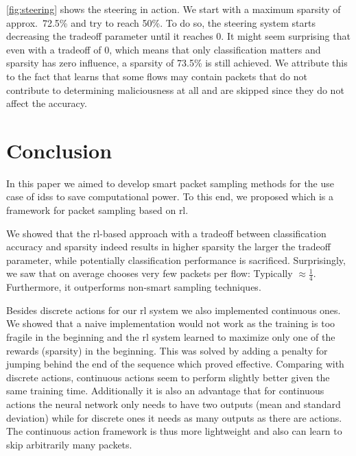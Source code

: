 \documentclass[conference]{IEEEtran}
\begin{document}
\autoref{fig:steering} shows the steering in action. We start with a maximum sparsity of approx.~72.5\% and try to reach 50\%. To do so, the steering system starts decreasing the tradeoff parameter until it reaches 0. It might seem surprising that even with a tradeoff of 0, which means that only classification matters and sparsity has zero influence, a sparsity of 73.5\% is still achieved. We attribute this to the fact that \ours{} learns that some flows may contain packets that do not contribute to determining maliciousness at all and are skipped since they do not affect the accuracy. %


\section{Conclusion}
\label{sec:conclusion}
In this paper we aimed to develop smart packet sampling methods for the use case of \glspl{ids} to save computational power. To this end, we proposed \ours{} which is a framework for packet sampling based on \gls{rl}.

We showed that the \gls{rl}-based approach with a tradeoff between classification accuracy and sparsity indeed results in higher sparsity the larger the tradeoff parameter, while potentially classification performance is sacrificed. Surprisingly, we saw that \ours{} on average chooses very few packets per flow: Typically $\approx \frac{1}{4}$. Furthermore, it outperforms non-smart sampling techniques.

Besides discrete actions for our \gls{rl} system we also implemented continuous ones. We showed that a naive implementation would not work as the training is too fragile in the beginning and the \gls{rl} system learned to maximize only one of the rewards (sparsity) in the beginning. This was solved by adding a penalty for jumping behind the end of the sequence which proved effective. Comparing with discrete actions, continuous actions seem to perform slightly better given the same training time. Additionally it is also an advantage that for continuous actions the neural network only needs to have two outputs (mean and standard deviation) while for discrete ones it needs as many outputs as there are actions. The continuous action framework is thus more lightweight and also can learn to skip arbitrarily many packets.
\end{document}
